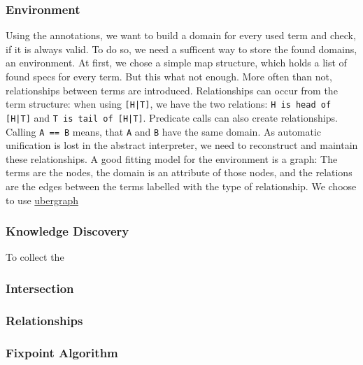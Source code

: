 \documentclass[a4paper]{article}
\begin{document}
\subsubsection{Environment}
Using the annotations, we want to build a domain for every used term and check,
if it is always valid. To do so, we need a sufficent way to store the found
domains, an environment. At first, we chose a simple map structure, which holds a list of found
specs for every term. But this what not enough.
More often than not, relationships between terms are introduced. Relationships
can occur from the term structure:
when using \texttt{[H|T]}, we have the two relations: \texttt{H is head of
  [H|T]} and \texttt{T is tail of [H|T]}.
Predicate calls can also create relationships. Calling \texttt{A == B} means,
that \texttt{A} and \texttt{B} have the same domain.
As automatic unification is lost in the abstract interpreter, we need to
reconstruct and maintain these relationships.
A good fitting model for the environment is a graph: The terms are the nodes,
the domain is an attribute of those nodes, and the relations are the edges
between the terms labelled with the type of relationship.
We choose to use \hyperlink{https://github.com/Engelberg/ubergraph}{ubergraph}


\subsubsection{Knowledge Discovery}
To collect the 
\subsubsection{Intersection}
\subsubsection{Relationships}
\subsubsection{Fixpoint Algorithm}
\end{document}
